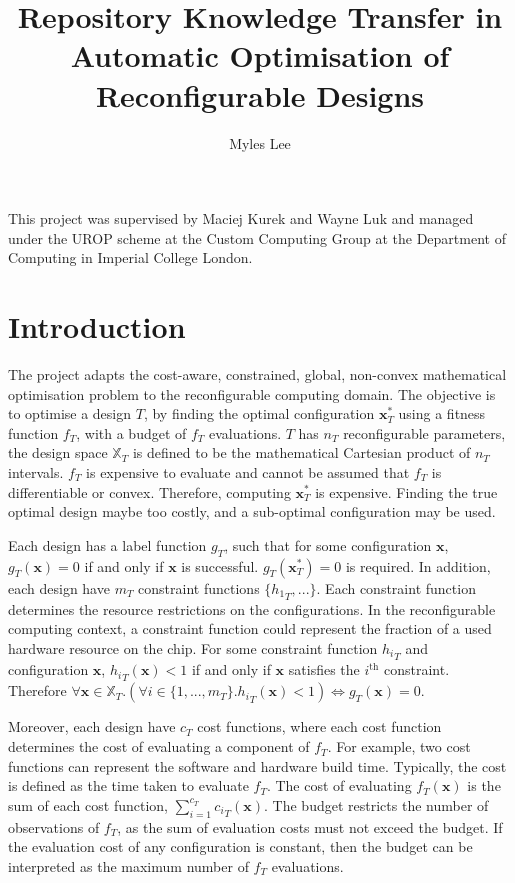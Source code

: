 \documentclass[10pt,a4paper]{article}
\author{Myles Lee}
\title{Repository Knowledge Transfer in Automatic Optimisation of
Reconfigurable Designs}
\begin{document}
\maketitle
This project was supervised by Maciej Kurek and Wayne Luk and managed under the UROP scheme at the Custom Computing Group at the Department of Computing in Imperial College London.

\section{Introduction}
The project adapts the cost-aware, constrained, global, non-convex mathematical optimisation problem to the reconfigurable computing domain. The objective is to optimise a design $T$, by finding the optimal configuration $\mathbf{x}_T^*$ using a fitness function $f_T$, with a budget of $f_T$ evaluations. $T$ has $n_T$ reconfigurable parameters, the design space $\mathbb{X}_T$ is defined to be the mathematical Cartesian product of $n_T$ intervals. $f_T$ is expensive to evaluate and cannot be assumed that $f_T$ is differentiable or convex. Therefore, computing $\mathbf{x}_T^*$ is expensive. Finding the true optimal design maybe too costly, and a sub-optimal configuration may be used.

Each design has a label function $g_T$, such that for some configuration $\mathbf{x}$, $g_T(\mathbf{x})=0$ if and only if $\mathbf{x}$ is successful. $g_T(\mathbf{x}_T^*)=0$ is required. In addition, each design have $m_T$ constraint functions $\{{h_1}_T,...\}$. Each constraint function determines the resource restrictions on the configurations. In the reconfigurable computing context, a constraint function could represent the fraction of a used hardware resource on the chip. For some constraint function ${h_i}_T$ and configuration $\mathbf{x}$, ${h_i}_T(\mathbf{x})<1$ if and only if $\mathbf{x}$ satisfies the $i^{\text{th}}$ constraint. Therefore $\forall \mathbf{x}\in\mathbb{X}_T.(\forall i\in\{1,...,m_T\}.{h_i}_T(\mathbf{x})<1)\Leftrightarrow g_T(\mathbf{x})=0$.

Moreover, each design have $c_T$ cost functions, where each cost function determines the cost of evaluating a component of $f_T$. For example, two cost functions can represent the software and hardware build time. Typically, the cost is defined as the time taken to evaluate $f_T$. The cost of evaluating $f_T(\mathbf{x})$ is the sum of each cost function, $\sum_{i=1}^{c_T}{c_i}_T(\mathbf{x})$. The budget restricts the number of observations of $f_T$, as the sum of evaluation costs must not exceed the budget. If the evaluation cost of any configuration is constant, then the budget can be interpreted as the maximum number of $f_T$ evaluations.
\end{document}
